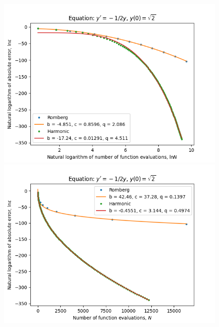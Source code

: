 \begin{figure}[H]
\centering
\begin{minipage}{0.45\textwidth}
\centering
\includegraphics[scale=0.45]{emr_plots/quad_sing_0_hp_log_log_pow_fit_trend.png}
\end{minipage}
\begin{minipage}{0.45\textwidth}
\centering
\includegraphics[scale=0.45]{emr_plots/quad_sing_0_hp_trend.png}
\end{minipage}
\end{figure}

